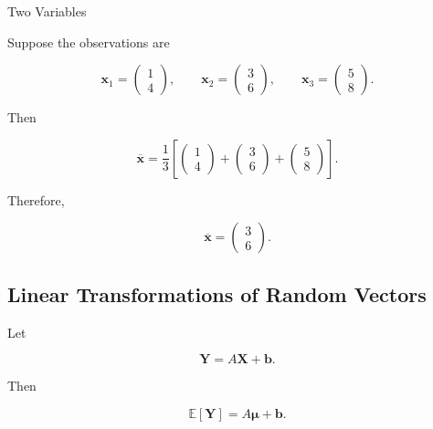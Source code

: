 \begin{workedexamplebox}{Two Variables}

Suppose the observations are

\[
\mathbf{x}_1=
\begin{pmatrix}
1\\
4
\end{pmatrix},
\qquad
\mathbf{x}_2=
\begin{pmatrix}
3\\
6
\end{pmatrix},
\qquad
\mathbf{x}_3=
\begin{pmatrix}
5\\
8
\end{pmatrix}.
\]

Then

\[
\overline{\mathbf{x}}
=
\frac13
\left[
\begin{pmatrix}
1\\
4
\end{pmatrix}
+
\begin{pmatrix}
3\\
6
\end{pmatrix}
+
\begin{pmatrix}
5\\
8
\end{pmatrix}
\right].
\]

Therefore,

\begin{answerbox}
\[
\boxed{
\overline{\mathbf{x}}
=
\begin{pmatrix}
3\\
6
\end{pmatrix}.
}
\]
\end{answerbox}

\end{workedexamplebox}

\subsection{Linear Transformations of Random Vectors}
\label{subsec:linear-transformations-random-vectors}

Let

\[
\mathbf{Y}
=
A\mathbf{X}+\mathbf{b}.
\]

Then

\[
\boxed{
\mathbb{E}[\mathbf{Y}]
=
A\boldsymbol{\mu}+\mathbf{b}.
}
\]

